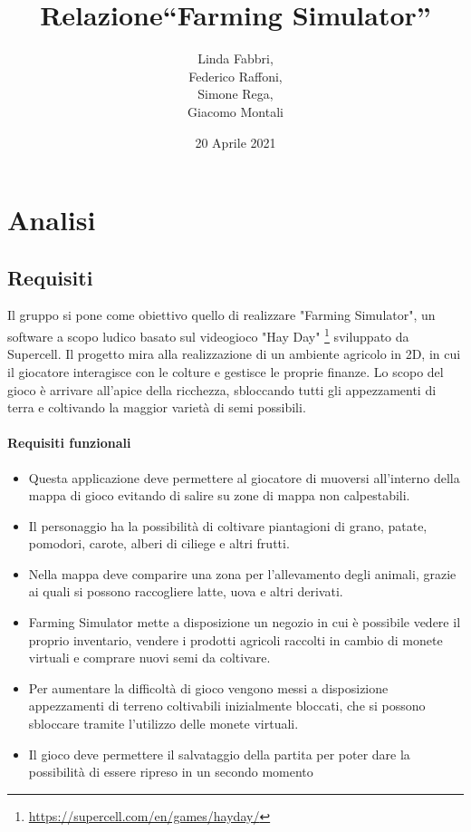 \documentclass[a4paper,12pt]{report}
\title{Relazione\break``Farming Simulator''}
\author{Linda Fabbri, \\ Federico Raffoni,\\ Simone Rega,\\ Giacomo Montali}
\date{20 Aprile 2021}
\begin{document}
\maketitle

\tableofcontents

\chapter{Analisi}


\section{Requisiti}


Il gruppo si pone come obiettivo quello di realizzare "Farming Simulator", un software a scopo ludico basato sul videogioco "Hay Day" \footnote{\url{https://supercell.com/en/games/hayday/}} sviluppato da Supercell.
Il progetto mira alla realizzazione di un ambiente agricolo in 2D, in cui il giocatore interagisce con le colture e gestisce le proprie finanze.
Lo scopo del gioco è arrivare all'apice della ricchezza, sbloccando tutti gli appezzamenti di terra e coltivando la maggior varietà di semi possibili.


\subsubsection{Requisiti funzionali}
\begin{itemize}
	\item Questa applicazione deve permettere al giocatore di muoversi all'interno della mappa di gioco evitando di salire su zone di mappa non calpestabili.
	\item Il personaggio ha la possibilità di coltivare piantagioni di grano, patate, pomodori, carote, alberi di ciliege e altri frutti.
	\item Nella mappa deve comparire una zona per l'allevamento degli animali, grazie ai quali si possono raccogliere latte, uova e altri derivati.
	\item Farming Simulator mette a disposizione un negozio in cui è possibile vedere il proprio inventario, vendere i prodotti agricoli raccolti in cambio di monete virtuali e comprare nuovi semi da coltivare.
	\item Per aumentare la difficoltà di gioco vengono messi a disposizione appezzamenti di terreno coltivabili inizialmente bloccati, che si possono sbloccare tramite l'utilizzo delle monete virtuali.
	\item Il gioco deve permettere il salvataggio della partita per poter dare la possibilità di essere ripreso in un secondo momento
\end{itemize}
\end{document}
